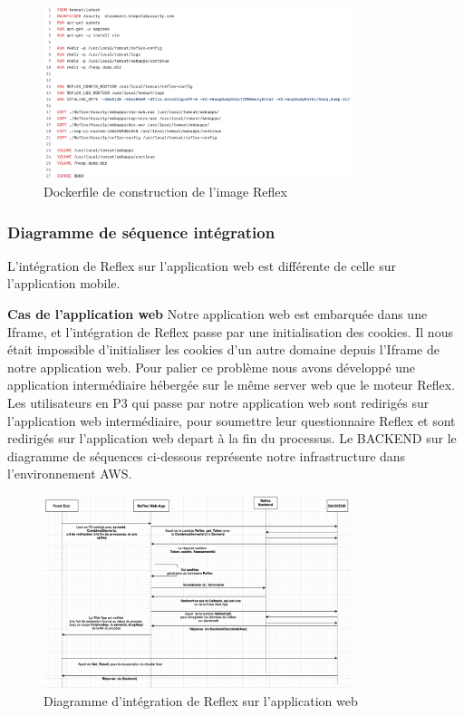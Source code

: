  \begin{figure}[H]
            \centering
                \includegraphics[width=0.8\textwidth]{Figures/dockerfile}
	       \decoRule
		\caption[Dockerfile de construction de l'image Reflex]{Dockerfile de construction de l'image Reflex}
	\label{fig:Dockerfile de construction de l'image Reflex}
\end{figure}
\newpage
\subsubsection{Diagramme de séquence intégration}
L'intégration de Reflex sur l'application web est différente de celle sur l'application mobile.

\textbf{Cas de l'application web}
Notre application web est embarquée dans une Iframe, et l'intégration de Reflex passe par une initialisation des cookies. Il nous était impossible d'initialiser les cookies d'un autre domaine depuis l'Iframe de notre application web. Pour palier ce problème nous avons développé une application intermédiaire hébergée sur le même server web que le moteur Reflex. Les utilisateurs en P3 qui passe par notre application web sont redirigés  sur  l'application web intermédiaire, pour soumettre leur questionnaire Reflex et sont redirigés sur l'application web depart à la fin du processus. Le BACKEND sur le diagramme de séquences ci-dessous représente notre infrastructure dans l'environnement AWS.
 \begin{figure}[H]
            \centering
                \includegraphics[width=0.8\textwidth]{Figures/reflexweb}
	       \decoRule
		\caption[Diagramme d'intégration de Reflex sur l'application web]{Diagramme d'intégration de Reflex sur l'application web}
	\label{fig:Diagramme d'intégration de Reflex sur l'application web}
\end{figure}

